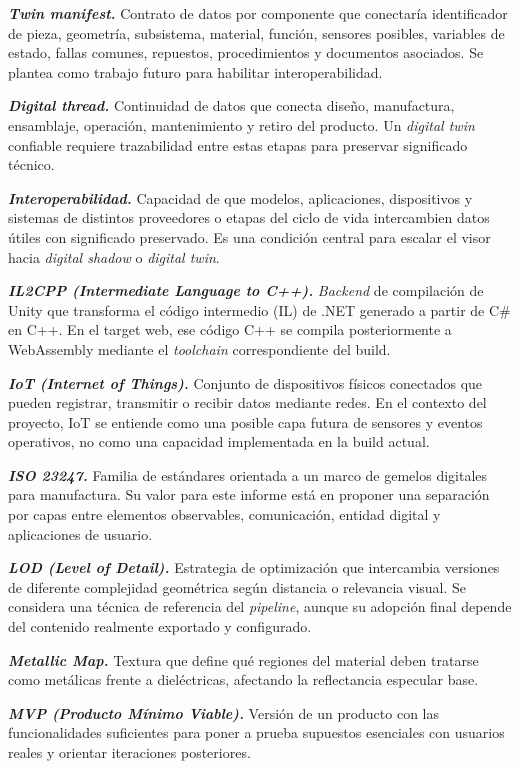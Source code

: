 \textbf{\textit{Twin manifest.}} Contrato de datos por componente que conectaría identificador de pieza, geometría, subsistema, material, función, sensores posibles, variables de estado, fallas comunes, repuestos, procedimientos y documentos asociados. Se plantea como trabajo futuro para habilitar interoperabilidad.

\textbf{\textit{Digital thread.}} Continuidad de datos que conecta diseño, manufactura, ensamblaje, operación, mantenimiento y retiro del producto. Un \textit{digital twin} confiable requiere trazabilidad entre estas etapas para preservar significado técnico.

\textbf{\textit{Interoperabilidad.}} Capacidad de que modelos, aplicaciones, dispositivos y sistemas de distintos proveedores o etapas del ciclo de vida intercambien datos útiles con significado preservado. Es una condición central para escalar el visor hacia \textit{digital shadow} o \textit{digital twin}.

\textbf{\textit{IL2CPP (Intermediate Language to C++).}} \textit{Backend} de compilación de Unity que transforma el código intermedio (IL) de .NET generado a partir de C\# en C++. En el target web, ese código C++ se compila posteriormente a WebAssembly mediante el \textit{toolchain} correspondiente del build.

\textbf{\textit{IoT (Internet of Things).}} Conjunto de dispositivos físicos conectados que pueden registrar, transmitir o recibir datos mediante redes. En el contexto del proyecto, IoT se entiende como una posible capa futura de sensores y eventos operativos, no como una capacidad implementada en la build actual.

\textbf{\textit{ISO 23247.}} Familia de estándares orientada a un marco de gemelos digitales para manufactura. Su valor para este informe está en proponer una separación por capas entre elementos observables, comunicación, entidad digital y aplicaciones de usuario.

\textbf{\textit{LOD (Level of Detail).}} Estrategia de optimización que intercambia versiones de diferente complejidad geométrica según distancia o relevancia visual. Se considera una técnica de referencia del \textit{pipeline}, aunque su adopción final depende del contenido realmente exportado y configurado.

\textbf{\textit{Metallic Map.}} Textura que define qué regiones del material deben tratarse como metálicas frente a dieléctricas, afectando la reflectancia especular base.

\textbf{\textit{MVP (Producto Mínimo Viable).}} Versión de un producto con las funcionalidades suficientes para poner a prueba supuestos esenciales con usuarios reales y orientar iteraciones posteriores.

